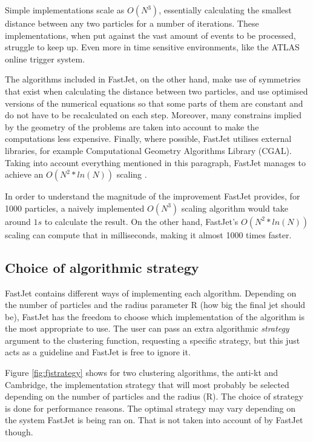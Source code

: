 Simple implementations scale as $O(N^3)$, essentially calculating the smallest distance between any two particles for a number of iterations. These implementations, when put against the vast amount of events to be processed, struggle to keep up. Even more in time sensitive environments, like the ATLAS online trigger system. 

The algorithms included in FastJet, on the other hand, make use of symmetries that exist when calculating the distance between two particles, and use optimised versions of the numerical equations so that some parts of them are constant and do not have to be recalculated on each step. Moreover, many constrains implied by the geometry of the problems are taken into account to make the computations less expensive. Finally, where possible, FastJet utilises external libraries, for example Computational Geometry Algorithms Library (CGAL). Taking into account everything mentioned in this paragraph, FastJet manages to achieve an $O(N^{2}* ln(N))$ scaling \cite{cacciari2012fastjet}.

In order to understand the magnitude of the improvement FastJet provides, for 1000 particles, a naively implemented $O(N^3)$ scaling algorithm would take around $1s$ to calculate the result. On the other hand, FastJet's $O(N^{2}* ln(N))$ scaling can compute that in milliseconds, making it almost 1000 times faster.


\subsection{Choice of algorithmic strategy}\label{ch:fjstrategy}
FastJet contains different ways of implementing each algorithm. Depending on the number of particles and the radius parameter R (how big the final jet should be), FastJet has the freedom to choose which implementation of the algorithm is the most appropriate to use. The user can pass an extra algorithmic \textit{strategy} argument to the clustering function, requesting a specific strategy, but this just acts as a guideline and FastJet is free to ignore it.

Figure \ref{fig:fjstrategy} shows for two clustering algorithms, the anti-kt and Cambridge, the implementation strategy that will most probably be selected depending on the number of particles and the radius (R). The choice of strategy is done for performance reasons. The optimal strategy may vary depending on the system FastJet is being ran on. That is not taken into account of by FastJet though.

